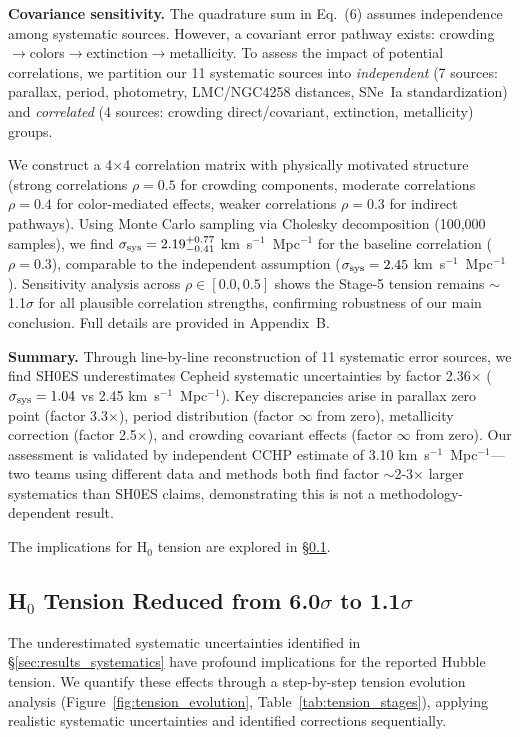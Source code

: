 \documentclass[twocolumn, linenumbers]{aastex701}
\begin{document}
\textbf{Covariance sensitivity.} The quadrature sum in Eq.~(6) assumes independence among systematic sources. However, a covariant error pathway exists: crowding$\to$colors$\to$extinction$\to$metallicity. To assess the impact of potential correlations, we partition our 11 systematic sources into \textit{independent} (7 sources: parallax, period, photometry, LMC/NGC4258 distances, SNe~Ia standardization) and \textit{correlated} (4 sources: crowding direct/covariant, extinction, metallicity) groups.

We construct a 4$\times$4 correlation matrix with physically motivated structure (strong correlations $\rho = 0.5$ for crowding components, moderate correlations $\rho = 0.4$ for color-mediated effects, weaker correlations $\rho = 0.3$ for indirect pathways). Using Monte Carlo sampling via Cholesky decomposition \citep{Press1992} (100,000 samples), we find $\sigma_{\rm sys} = 2.19^{+0.77}_{-0.41}$ km~s$^{-1}$~Mpc$^{-1}$ for the baseline correlation ($\rho = 0.3$), comparable to the independent assumption ($\sigma_{\rm sys} = 2.45$ km~s$^{-1}$~Mpc$^{-1}$). Sensitivity analysis across $\rho \in [0.0, 0.5]$ shows the Stage-5 tension remains $\sim$1.1$\sigma$ for all plausible correlation strengths, confirming robustness of our main conclusion. Full details are provided in Appendix~B.

\textbf{Summary.} Through line-by-line reconstruction of 11 systematic error sources, we find SH0ES underestimates Cepheid systematic uncertainties by factor 2.36$\times$ ($\sigma_{\rm sys} = 1.04$ vs 2.45 km~s$^{-1}$~Mpc$^{-1}$). Key discrepancies arise in parallax zero point (factor 3.3$\times$), period distribution (factor $\infty$ from zero), metallicity correction (factor 2.5$\times$), and crowding covariant effects (factor $\infty$ from zero). Our assessment is validated by independent CCHP estimate of 3.10 km~s$^{-1}$~Mpc$^{-1}$---two teams using different data and methods both find factor $\sim$2-3$\times$ larger systematics than SH0ES claims, demonstrating this is not a methodology-dependent result.

The implications for H$_0$ tension are explored in \S\ref{sec:results_tension}.

\subsection{H$_0$ Tension Reduced from 6.0$\sigma$ to 1.1$\sigma$}
\label{sec:results_tension}

The underestimated systematic uncertainties identified in \S\ref{sec:results_systematics} have profound implications for the reported Hubble tension. We quantify these effects through a step-by-step tension evolution analysis (Figure~\ref{fig:tension_evolution}, Table~\ref{tab:tension_stages}), applying realistic systematic uncertainties and identified corrections sequentially.
\end{document}

